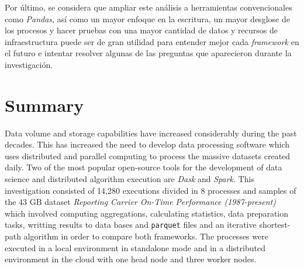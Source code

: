 \documentclass[11pt, oneside]{book}
\begin{document}
Por último, se considera que ampliar este análisis a herramientas convencionales como \textit{Pandas}, así como un mayor enfoque en la escritura, un mayor desglose de los procesos y hacer pruebas con una mayor cantidad de datos y recursos de infraestructura puede ser de gran utilidad para entender mejor cada \textit{framework} en el futuro e intentar resolver algunas de las preguntas que aparecieron durante la investigación.

\pagestyle{plain}

\noindent 


\chapter*{Summary}

\noindent Data volume and storage capabilities have increased considerably during the past decades. This has increased the need to develop data processing software which uses distributed and parallel computing to process the massive datasets created daily. Two of the most popular open-source tools for the development of data science and distributed algorithm execution are \textit{Dask} and \textit{Spark}. This investigation consisted of 14,280 executions divided in 8 processes and samples of the 43 GB dataset \textit{Reporting Carrier On-Time Performance (1987-present)} which involved computing aggregations, calculating statistics, data preparation tasks, writting results to data bases and \texttt{parquet} files and an iterative shortest-path algorithm in order to compare both frameworks. The processes were executed in a local environment in standalone mode and in a distributed environment in the cloud with one head node and three worker nodes.
\end{document}
